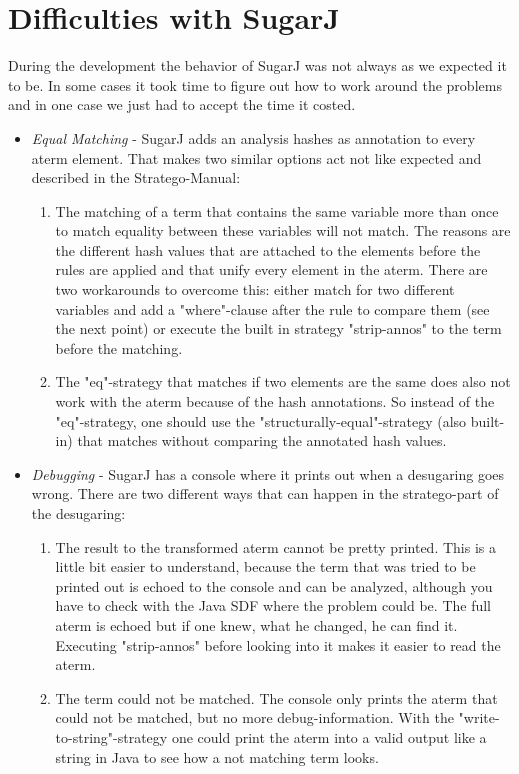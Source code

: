 \documentclass{report}
\begin{document}
\section{Difficulties with SugarJ}
During the development the behavior of SugarJ was not always as we expected it to be. In some cases it took time to figure out how to work around the problems and in one case we just had to accept the time it costed.
\begin{itemize}
\item \emph{Equal Matching} - SugarJ adds an analysis hashes as annotation to every aterm element. That makes two similar options act not like expected and described in the Stratego-Manual\cite{Stratego-Manual}:
\begin{enumerate}
 \item The matching of a term that contains the same variable more than once to match equality between these variables will not match. The reasons are the different hash values that are attached to the elements before the rules are applied and that unify every element in the aterm. There are two workarounds to overcome this: either match for two different variables and add a "where"-clause after the rule to compare them (see the next point) or execute the built in strategy "strip-annos" to the term before the matching.
 \item The "eq"-strategy that matches if two elements are the same does also not work with the aterm because of the hash annotations.  So instead of the "eq"-strategy, one should use the "structurally-equal"-strategy (also built-in) that matches without comparing the annotated hash values.
\end{enumerate}
\item \emph{Debugging} - SugarJ has a console where it prints out when a desugaring goes wrong. There are two different ways that can happen in the stratego-part of the desugaring:
\begin{enumerate}
 \item The result to the transformed aterm cannot be pretty printed. This is a little bit easier to understand, because the term that was tried to be printed out is echoed to the console and can be analyzed, although you have to check with the Java SDF\cite{Java-SDF-2014} where the problem could be. The full aterm is echoed but if one knew, what he changed, he can find it. Executing "strip-annos" before looking into it makes it easier to read the aterm.
 \item The term could not be matched. The console only prints the aterm that could not be matched, but no more debug-information. With the "write-to-string"-strategy one could print the aterm into a valid output like a string in Java to see how a not matching term looks.

\end{enumerate}
\end{itemize}
\end{document}
